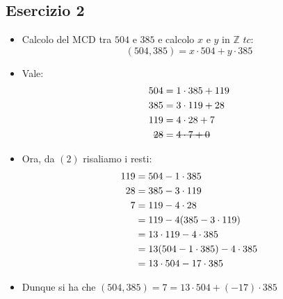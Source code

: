 \documentclass[10pt]{article}
\begin{document}
	\subsection{Esercizio 2}
	\begin{itemize}
	\item
	Calcolo del MCD tra $504$ e $385$ e calcolo $x$ e $y$ in $\mathbb{Z}$ $tc:$ $$(504,385) = x \cdot 504 + y \cdot 385$$
	\item
	Vale:
	\begin{equation}
	\begin{split}
	504 &= 1 \cdot 385 + 119 \\
	385 &= 3 \cdot 119 + 28 \\
	119 &= 4 \cdot 28 + 7 \\
	\hbox{\sout{$28$}} &= \hbox{\sout{$4 \cdot 7 + 0$}}
	\end{split}
	\end{equation}
	
	\item
	Ora, da $(2)$ risaliamo i resti:
	\begin{equation}
	\begin{split}
	119 &= 504 - 1 \cdot 385 \\
	28 &= 385 - 3 \cdot 119 \\
	7 &= 119 - 4 \cdot 28 \\
	& = 119 - 4(385 - 3 \cdot 119) \\
	& = 13 \cdot 119 - 4 \cdot 385 \\
	& = 13(504 - 1 \cdot 385) - 4 \cdot 385 \\
	& = 13 \cdot 504 - 17 \cdot 385
	\notag
	\end{split}
	\end{equation}
	\item
	Dunque si ha che $(504,385) = 7 = 13 \cdot 504 + (-17) \cdot 385 $
	\end{itemize}
	
\end{document}
